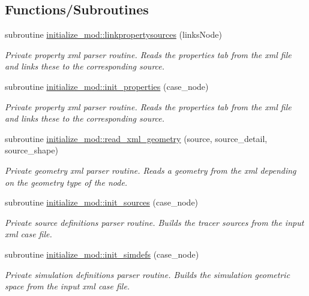 \subsection*{Functions/\+Subroutines}
\begin{DoxyCompactItemize}
\item 
subroutine \mbox{\hyperlink{namespaceinitialize__mod_af38ade977df8d56db1d125bc4cc03a4a}{initialize\+\_\+mod\+::linkpropertysources}} (links\+Node)
\begin{DoxyCompactList}\small\item\em Private property xml parser routine. Reads the properties tab from the xml file and links these to the corresponding source. \end{DoxyCompactList}\item 
subroutine \mbox{\hyperlink{namespaceinitialize__mod_a4c7a93dca8bb7b573e91f877033ab22a}{initialize\+\_\+mod\+::init\+\_\+properties}} (case\+\_\+node)
\begin{DoxyCompactList}\small\item\em Private property xml parser routine. Reads the properties tab from the xml file and links these to the corresponding source. \end{DoxyCompactList}\item 
subroutine \mbox{\hyperlink{namespaceinitialize__mod_aebe8236f74bc6665b16463683c478602}{initialize\+\_\+mod\+::read\+\_\+xml\+\_\+geometry}} (source, source\+\_\+detail, source\+\_\+shape)
\begin{DoxyCompactList}\small\item\em Private geometry xml parser routine. Reads a geometry from the xml depending on the geometry type of the node. \end{DoxyCompactList}\item 
subroutine \mbox{\hyperlink{namespaceinitialize__mod_aae6a35bca190cdf65a6146f254264cd1}{initialize\+\_\+mod\+::init\+\_\+sources}} (case\+\_\+node)
\begin{DoxyCompactList}\small\item\em Private source definitions parser routine. Builds the tracer sources from the input xml case file. \end{DoxyCompactList}\item 
subroutine \mbox{\hyperlink{namespaceinitialize__mod_a18736cca205403067232125b8e510ab2}{initialize\+\_\+mod\+::init\+\_\+simdefs}} (case\+\_\+node)
\begin{DoxyCompactList}\small\item\em Private simulation definitions parser routine. Builds the simulation geometric space from the input xml case file. \end{DoxyCompactList}\item 

\end{DoxyCompactItemize}
